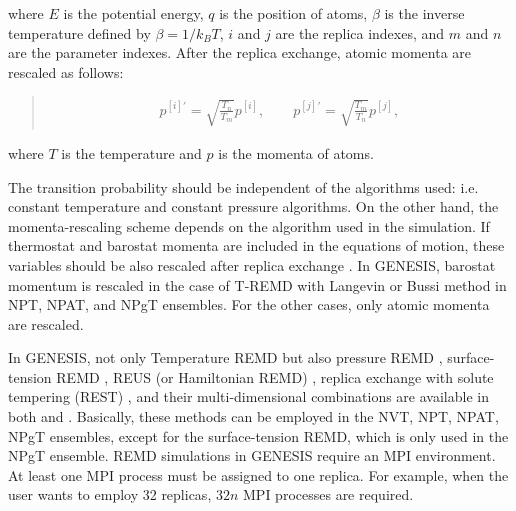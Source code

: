 \documentclass[a4paper,11pt,oneside,english]{sphinxmanual}
\begin{document}
where \(E\) is the potential energy, \(q\) is the position of atoms,
\(\beta\) is the inverse temperature defined by \(\beta = 1/k_B T\),
\(i\) and \(j\) are the replica indexes, and \(m\) and \(n\)
are the parameter indexes.
After the replica exchange, atomic momenta are rescaled as follows:
\begin{quote}

\vspace{-5mm}
\begin{equation*}
\begin{split}p^{[i]'} = \sqrt{\frac{T_{n}}{T_{m}}} p^{[i]}, \qquad p^{[j]'} = \sqrt{\frac{T_{m}}{T_{n}}} p^{[j]},\end{split}
\end{equation*}
\vspace{-3mm}
\end{quote}

where \(T\) is the temperature and \(p\) is the momenta of atoms.

The transition probability should be independent of the algorithms used:
i.e. constant temperature and constant pressure algorithms.
On the other hand, the momenta-rescaling scheme depends on the algorithm
used in the simulation.
If thermostat and barostat momenta are included in the equations of motion,
these variables should be also rescaled after replica exchange
 .
In GENESIS, barostat momentum is rescaled in the case of T-REMD with
Langevin or Bussi method in NPT, NPAT, and NPgT ensembles.
For the other cases, only atomic momenta are rescaled.

In GENESIS, not only Temperature REMD but also pressure REMD ,
surface-tension REMD , REUS (or Hamiltonian REMD)  , replica exchange with solute tempering (REST)  ,
and their multi-dimensional combinations are available in both  and .
Basically, these methods can be employed in the NVT, NPT, NPAT, NPgT ensembles,
except for the surface-tension REMD, which is only used in the NPgT ensemble.
REMD simulations in GENESIS require an MPI environment.
At least one MPI process must be assigned to one replica.
For example, when the user wants to employ 32 replicas,
\(32n\) MPI processes are required.
\end{document}
